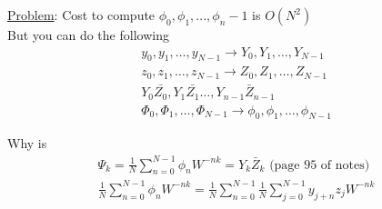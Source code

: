 \documentclass[10pt,usletter]{article}
\begin{document}
\underline{Problem}: Cost to compute $\phi_0,\phi_1,...,\phi_n-1$ is $O(N^2)$\\
But you can do the following
\begin{align*}
y_0,y_1,\hdots,y_{N-1}\rightarrow Y_0,Y_1,\hdots,Y_{N-1}\\
z_0,z_1,\hdots,z_{N-1}\rightarrow Z_0,Z_1,\hdots,Z_{N-1}\\
Y_0\bar{Z_0},Y_1\bar{Z_1}\hdots,Y_{n-1}\bar{Z}_{n-1}\\
\Phi_0,\Phi_1,\hdots,\Phi_{N-1}\rightarrow \phi_0,\phi_1,\hdots,\phi_{N-1}
\end{align*}


Why is \begin{align*}
\Psi_k=\frac{1}{N}\sum_{n=0}^{N-1}\phi_n W^{-nk}=Y_k \bar{Z}_{k} \text{ (page 95 of notes)}\\
\frac{1}{N}\sum_{n=0}^{N-1}\phi_nW^{-nk}=\frac{1}{N}\sum_{n=0}^{N-1}\frac{1}{N}\sum_{j=0}^{N-1}y_{j+n}z_jW^{-nk}
\end{align*}
\end{document}
